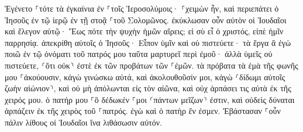 \documentclass{openreader}
\begin{document}
Ἐγένετο ⸀τότε τὰ ἐγκαίνια ἐν ⸀τοῖς Ἱεροσολύμοις· ⸀χειμὼν ἦν, 
καὶ περιεπάτει ὁ Ἰησοῦς ἐν τῷ ἱερῷ ἐν τῇ στοᾷ ⸀τοῦ Σολομῶνος. 
ἐκύκλωσαν οὖν αὐτὸν οἱ Ἰουδαῖοι καὶ ἔλεγον αὐτῷ· Ἕως πότε τὴν ψυχὴν ἡμῶν αἴρεις; εἰ σὺ εἶ ὁ χριστός, εἰπὲ ἡμῖν παρρησίᾳ. 
ἀπεκρίθη αὐτοῖς ὁ Ἰησοῦς· Εἶπον ὑμῖν καὶ οὐ πιστεύετε· τὰ ἔργα ἃ ἐγὼ ποιῶ ἐν τῷ ὀνόματι τοῦ πατρός μου ταῦτα μαρτυρεῖ περὶ ἐμοῦ· 
ἀλλὰ ὑμεῖς οὐ πιστεύετε, ⸂ὅτι οὐκ⸃ ἐστὲ ἐκ τῶν προβάτων τῶν ⸀ἐμῶν. 
τὰ πρόβατα τὰ ἐμὰ τῆς φωνῆς μου ⸀ἀκούουσιν, κἀγὼ γινώσκω αὐτά, καὶ ἀκολουθοῦσίν μοι, 
κἀγὼ ⸂δίδωμι αὐτοῖς ζωὴν αἰώνιον⸃, καὶ οὐ μὴ ἀπόλωνται εἰς τὸν αἰῶνα, καὶ οὐχ ἁρπάσει τις αὐτὰ ἐκ τῆς χειρός μου. 
ὁ πατήρ μου ⸀ὃ δέδωκέν ⸀μοι ⸂πάντων μεῖζων⸃ ἐστιν, καὶ οὐδεὶς δύναται ἁρπάζειν ἐκ τῆς χειρὸς τοῦ ⸀πατρός. 
ἐγὼ καὶ ὁ πατὴρ ἕν ἐσμεν. 
Ἐβάστασαν ⸀οὖν πάλιν λίθους οἱ Ἰουδαῖοι ἵνα λιθάσωσιν αὐτόν. 
\end{document}
